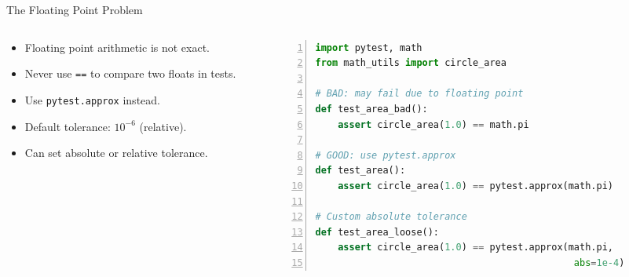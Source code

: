 {}
{}
{}

\begin{frame}{The Floating Point Problem}
\setlength{\leftmargini}{0.25cm}
\begin{columns}[c,t,totalwidth=1.0\textwidth]
\begin{column}[c]{0.45\linewidth}
\begin{block}{}
\begin{itemize}
\item Floating point arithmetic is not exact.
\item Never use \texttt{==} to compare two floats in tests.
\item Use \texttt{pytest.approx} instead.
\item Default tolerance: $10^{-6}$ (relative).
\item Can set absolute or relative tolerance.
\end{itemize}
\end{block}
\end{column}
\begin{column}[c]{0.48\linewidth}
\begin{lstlisting}[style=fullwidth,language=python,numbers=left]
import pytest, math
from math_utils import circle_area

# BAD: may fail due to floating point
def test_area_bad():
    assert circle_area(1.0) == math.pi

# GOOD: use pytest.approx
def test_area():
    assert circle_area(1.0) == pytest.approx(math.pi)

# Custom absolute tolerance
def test_area_loose():
    assert circle_area(1.0) == pytest.approx(math.pi,
                                              abs=1e-4)
\end{lstlisting}
\end{column}
\end{columns}
\end{frame}


